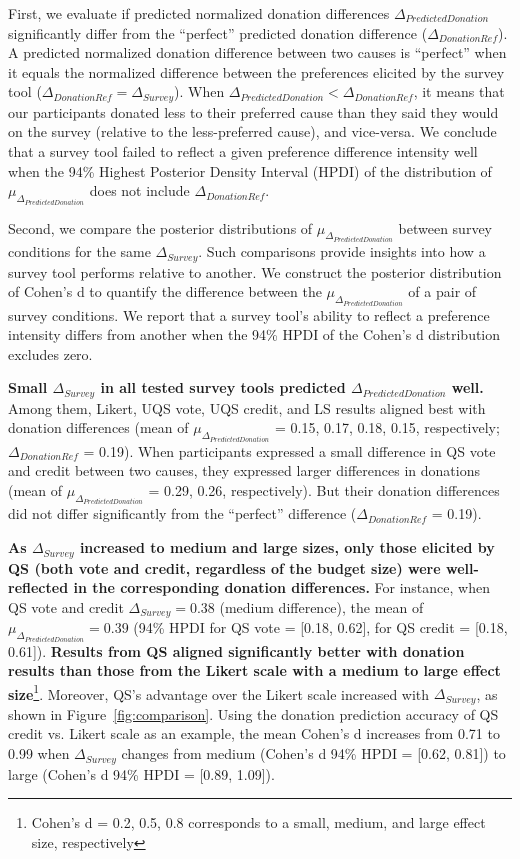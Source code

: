 First, we evaluate if predicted normalized donation differences $\Delta_{PredictedDonation}$ significantly differ from the ``perfect'' predicted donation difference ($\Delta_{DonationRef}$). A predicted normalized donation difference between two causes is ``perfect'' when it equals the normalized difference between the preferences elicited by the survey tool ($\Delta_{DonationRef} = \Delta_{Survey}$). When $\Delta_{PredictedDonation} < \Delta_{DonationRef}$, it means that our participants donated less to their preferred cause than they said they would on the survey (relative to the less-preferred cause), and vice-versa. We conclude that a survey tool failed to reflect a given preference difference intensity well when the 94\% Highest Posterior Density Interval (HPDI) of the distribution of $\mu_{\Delta_{PredictedDonation}}$ does not include $\Delta_{DonationRef}$. 

Second, we compare the posterior distributions of $\mu_{\Delta_{PredictedDonation}}$ between survey conditions for the same $\Delta_{Survey}$. Such comparisons provide insights into how a survey tool performs relative to another. We construct the posterior distribution of Cohen's d to quantify the difference between the $\mu_{\Delta_{PredictedDonation}}$ of a pair of survey conditions. We report that a survey tool's ability to reflect a preference intensity differs from another when the 94\% HPDI of the Cohen's d distribution excludes zero. 

\textbf{Small $\Delta_{Survey}$ in all tested survey tools predicted $\Delta_{PredictedDonation}$ well.} Among them, Likert, UQS vote, UQS credit, and LS results aligned best with donation differences (mean of $\mu_{\Delta_{PredictedDonation}}$ = 0.15, 0.17, 0.18, 0.15, respectively; $\Delta_{DonationRef}$ = 0.19). When participants expressed a small difference in QS vote and credit between two causes, they expressed larger differences in donations (mean of $\mu_{\Delta_{PredictedDonation}}$ = 0.29, 0.26, respectively). But their donation differences did not differ significantly from the ``perfect'' difference ($\Delta_{DonationRef}$ = 0.19).

\textbf{As $\Delta_{Survey}$ increased to medium and large sizes, only those elicited by QS (both vote and credit, regardless of the budget size) were well-reflected in the corresponding donation differences.} For instance, when QS vote and credit $\Delta_{Survey} = 0.38$ (medium difference), the mean of $\mu_{\Delta_{PredictedDonation}} = 0.39$ (94\% HPDI for QS vote = [0.18, 0.62], for QS credit = [0.18, 0.61]). \textbf{Results from QS aligned significantly better with donation results than those from the Likert scale with a medium to large effect size}\footnote{Cohen's d = 0.2, 0.5, 0.8 corresponds to a small, medium, and large effect size, respectively}. Moreover, QS's advantage over the Likert scale increased with $\Delta_{Survey}$, as shown in Figure~\ref{fig:comparison}. Using the donation prediction accuracy of QS credit vs. Likert scale as an example, the mean Cohen's d increases from 0.71 to 0.99 when $\Delta_{Survey}$ changes from medium (Cohen's d 94\% HPDI = [0.62, 0.81]) to large (Cohen's d 94\% HPDI = [0.89, 1.09]).

